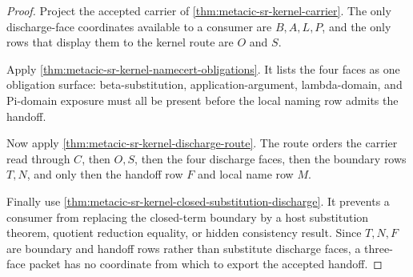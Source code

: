 \begin{proof}
Project the accepted carrier of \autoref{thm:metacic-sr-kernel-carrier}. The only discharge-face coordinates available to a consumer are $B,A,L,P$, and the only rows that display them to the kernel route are $O$ and $S$.

Apply \autoref{thm:metacic-sr-kernel-namecert-obligations}. It lists the four faces as one obligation surface: beta-substitution, application-argument, lambda-domain, and Pi-domain exposure must all be present before the local naming row admits the handoff.

Now apply \autoref{thm:metacic-sr-kernel-discharge-route}. The route orders the carrier read through $C$, then $O,S$, then the four discharge faces, then the boundary rows $T,N$, and only then the handoff row $F$ and local name row $M$.

Finally use \autoref{thm:metacic-sr-kernel-closed-substitution-discharge}. It prevents a consumer from replacing the closed-term boundary by a host substitution theorem, quotient reduction equality, or hidden consistency result. Since $T,N,F$ are boundary and handoff rows rather than substitute discharge faces, a three-face packet has no coordinate from which to export the accepted handoff.
\end{proof}




